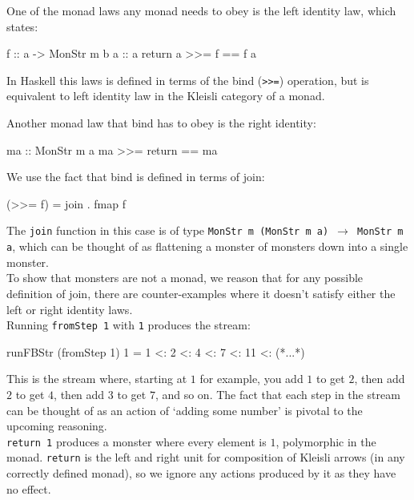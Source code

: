One of the monad laws any monad needs to obey is the left identity law, which states: 
\begin{haskell}
f :: a -> MonStr m b
a :: a
return a  >>=  f == f a
\end{haskell}
In Haskell this laws is defined in terms of the bind (\verb+>>=+) operation, but is equivalent to left identity law in the Kleisli category of a monad.

Another monad law that bind has to obey is the right identity:
\begin{haskell}
ma :: MonStr m a
ma  >>= return == ma
\end{haskell}

We use the fact that bind is defined in terms of join:
\begin{haskell}
(>>= f) = join . fmap f 
\end{haskell}
The \verb+join+ function in this case is of type \texttt{MonStr m (MonStr m a) $\to$ MonStr m a}, which can be thought of as flattening a monster of monsters down into a single monster. \\

To show that monsters are not a monad, we reason that for any possible definition of join, there are counter-examples where it doesn't satisfy either the left or right identity laws.\\

Running \verb+fromStep 1+ with \verb+1+ produces the stream:
\begin{haskell}
runFBStr (fromStep 1) 1 = 1 <: 2 <: 4 <: 7 <: 11 <: (*...*)
\end{haskell}

This is the stream where, starting at $1$ for example, you add $1$ to get $2$, then add $2$ to get $4$, then add $3$ to get $7$, and so on. The fact that each step in the stream can be thought of as an action of `adding some number' is pivotal to the upcoming reasoning.\\

\verb+return 1+ produces a monster where every element is $1$, polymorphic in the monad. \verb+return+ is the left and right unit for composition of Kleisli arrows (in any correctly defined monad), so we ignore any actions produced by it as they have no effect. \\



